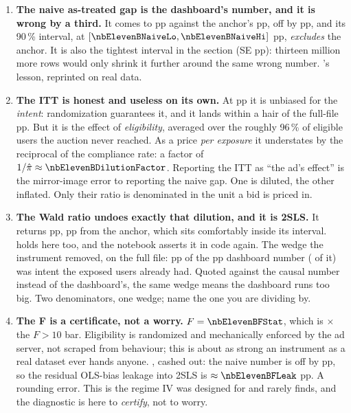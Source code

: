 \begin{enumerate}[leftmargin=*, itemsep=.35em]
  \item \textbf{The naive as-treated gap is the dashboard's number, and it is wrong by a third.}
        It comes to \nbElevenBNaive{} pp against the anchor's \nbElevenBAnchorWald{} pp, off by
        \nbElevenBNaiveErr{} pp, and its 90\,\% interval, at
        $[\nbElevenBNaiveLo, \nbElevenBNaiveHi]$ pp, \emph{excludes} the anchor. It is also the
        tightest interval in the section (SE \nbElevenBNaiveSe{} pp): thirteen million more rows
        would only shrink it further around the same wrong number. 's lesson,
        reprinted on real data.
  \item \textbf{The ITT is honest and useless on its own.} At \nbElevenBReduced{} pp it is unbiased
        for the \emph{intent}: randomization guarantees it, and it lands within a hair of the
        full-file \nbElevenBAnchorItt{} pp. But it is the effect of \emph{eligibility}, averaged over
        the roughly 96\,\% of eligible users the auction never reached. As a price \emph{per
        exposure} it understates by the reciprocal of the compliance rate: a factor of
        $1/\hat\pi \approx \nbElevenBDilutionFactor$. Reporting the ITT as ``the ad's effect'' is the
        mirror-image error to reporting the naive gap. One is diluted, the other inflated. Only their
        ratio is denominated in the unit a bid is priced in.
  \item \textbf{The Wald ratio undoes exactly that dilution, and it is 2SLS.} It returns
        \nbElevenBWald{} pp, \nbElevenBWaldErr{} pp from the anchor, which sits comfortably inside
        its interval.  holds here too, and the notebook asserts it in code again.
        The wedge the instrument removed, on the full file: \nbElevenBAnchorWedge{} pp of the
        \nbElevenBAnchorNaive{} pp dashboard number (\pc{\nbElevenBAnchorWedgeShare} of it) was
        intent the exposed users already had. Quoted against the causal number instead of the
        dashboard's, the same wedge means the dashboard runs \pc{\nbElevenBAnchorInflation} too big.
        Two denominators, one wedge; name the one you are dividing by.
  \item \textbf{The F is a certificate, not a worry.} $F = \nbElevenBFStat$, which is
        \nbElevenBFOverBar$\times$ the $F > 10$ bar. Eligibility is randomized and mechanically
        enforced by the ad server, not scraped from behaviour; this is about as strong an instrument
        as a real dataset ever hands anyone. , cashed out: the naive number is
        off by \nbElevenBNaiveErr{} pp, so the residual OLS-bias leakage into 2SLS is
        $\approx \nbElevenBFLeak$ pp. A rounding error. This is the regime IV was designed for and
        rarely finds, and the diagnostic is here to \emph{certify}, not to worry.
\end{enumerate}

